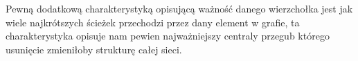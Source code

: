 \documentclass[a4paper, 12pt]{article}
\begin{document}
Pewną dodatkową charakterystyką opisującą ważność danego wierzchołka jest jak wiele najkrótszych ścieżek przechodzi przez dany element w grafie, ta charakterystyka opisuje nam pewien najważniejszy centraly przegub którego usunięcie zmieniłoby strukturę całej sieci.

\begin{center}
    
\end{center}
\end{document}
